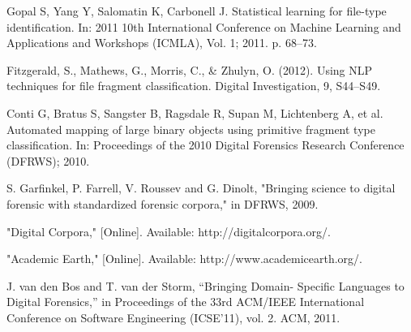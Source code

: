 Gopal S, Yang Y, Salomatin K, Carbonell J. Statistical learning for file-type identification. In: 2011 10th International Conference on Machine Learning and Applications and Workshops (ICMLA), Vol. 1; 2011. p. 68–73.

Fitzgerald, S., Mathews, G., Morris, C., \& Zhulyn, O. (2012). Using NLP techniques for file fragment classification. Digital Investigation, 9, S44–S49.

Conti G, Bratus S, Sangster B, Ragsdale R, Supan M, Lichtenberg A, et al. Automated mapping of large binary objects using primitive fragment type classification. In: Proceedings of the 2010 Digital Forensics Research Conference (DFRWS); 2010.

S. Garfinkel, P. Farrell, V. Roussev and G. Dinolt, "Bringing science to digital forensic with standardized forensic corpora," in DFRWS, 2009.

"Digital Corpora," [Online]. Available: http://digitalcorpora.org/.

"Academic Earth," [Online]. Available: http://www.academicearth.org/.

J. van den Bos and T. van der Storm, “Bringing Domain- Specific Languages to Digital Forensics,” in Proceedings of the 33rd ACM/IEEE International Conference on Software Engineering (ICSE’11), vol. 2. ACM, 2011.